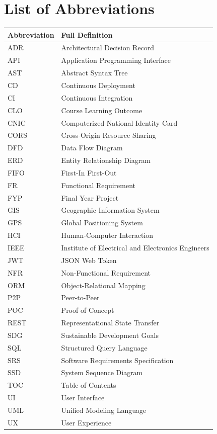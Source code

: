 \chapter*{List of Abbreviations}

\begin{longtable}{ll}
\toprule
\textbf{Abbreviation} & \textbf{Full Definition} \\
\midrule
\endhead
\bottomrule
\endfoot
ADR & Architectural Decision Record \\
API & Application Programming Interface \\
AST & Abstract Syntax Tree \\
CD & Continuous Deployment \\
CI & Continuous Integration \\
CLO & Course Learning Outcome \\
CNIC & Computerized National Identity Card \\
CORS & Cross-Origin Resource Sharing \\
DFD & Data Flow Diagram \\
ERD & Entity Relationship Diagram \\
FIFO & First-In First-Out \\
FR & Functional Requirement \\
FYP & Final Year Project \\
GIS & Geographic Information System \\
GPS & Global Positioning System \\
HCI & Human-Computer Interaction \\
IEEE & Institute of Electrical and Electronics Engineers \\
JWT & JSON Web Token \\
NFR & Non-Functional Requirement \\
ORM & Object-Relational Mapping \\
P2P & Peer-to-Peer \\
POC & Proof of Concept \\
REST & Representational State Transfer \\
SDG & Sustainable Development Goals \\
SQL & Structured Query Language \\
SRS & Software Requirements Specification \\
SSD & System Sequence Diagram \\
TOC & Table of Contents \\
UI & User Interface \\
UML & Unified Modeling Language \\
UX & User Experience \\
\end{longtable}
